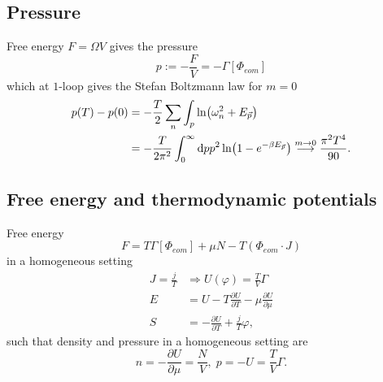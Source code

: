 \subsection{Pressure}
\begin{mybox}{}
	Free energy $F=\Omega V$ gives the pressure
	\begin{equation}
		p:= - \frac{F}{V} = - \Gamma[\Phi_{eom}]
	\end{equation}
	which at $1$-loop gives the Stefan Boltzmann law for $m=0$
	\begin{align}
		p(T)-p(0) &= -\frac{T}{2} \sum_n \int_p \ln(\omega^2_n + E_{\vec{p}}) \\
		&=-\frac{T}{2 \pi^2} \int_0^\infty \mathrm{d} p p^2\ln(1-e^{-\beta E_{\vec{p}}}) \stackrel{m\rightarrow0}{\longrightarrow} \frac{\pi^2 T^4}{90}.
	\end{align}
\end{mybox}
\subsection{Free energy and thermodynamic potentials}
\begin{mybox}{}
Free energy
\begin{equation}
	F= T\Gamma[\Phi_{eom}] + \mu N-T(\Phi_{eom}\cdot J)
\end{equation}
in a homogeneous setting
\begin{align}
	J=\frac{j}{T} &\Rightarrow U(\varphi)=\frac{T}{V} \Gamma \\
	E&=U-T\frac{\partial U}{\partial T}-\mu \frac{\partial U}{\partial \mu}\\
	S&= - \frac{\partial U}{\partial T} + \frac{j}{T}\varphi, 
\end{align}
such that density and pressure in a homogeneous setting are
\begin{equation}
	n=-\frac{\partial U}{\partial \mu} = \frac{N}{V},\; p=-U=\frac{T}{V} \Gamma.
\end{equation}
\end{mybox}


